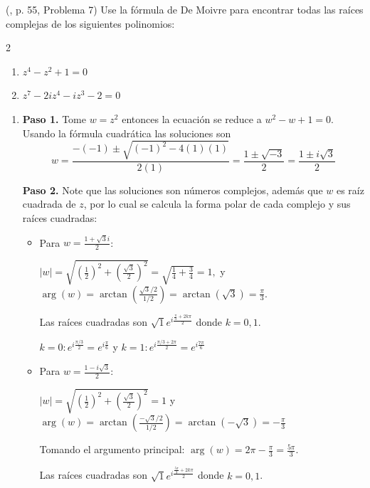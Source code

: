 \begin{example} (\cite{andreescu2014complex}, p. 55, Problema 7) Use la fórmula de De Moivre para encontrar todas las raíces complejas de los siguientes polinomios:

\begin{multicols}{2}
\begin{enumerate}[$a)$]
\item $z^4-z^2+1=0$
\item $z^7-2iz^4-iz^3-2=0$
\end{enumerate}
\end{multicols}

\begin{myproof}
\begin{enumerate}[$a)$]
\item \textbf{Paso 1.} Tome $w=z^2$ entonces la ecuación se reduce a $w^2-w+1=0$. Usando la fórmula cuadrática las soluciones son  $$w = \frac{-(-1)\pm\sqrt{(-1)^2-4(1)(1)}}{2(1)} = \frac{1\pm\sqrt{-3}}{2} = \frac{1\pm i\sqrt{3}}{2}$$

\textbf{Paso 2.} Note que las soluciones son números complejos, además que $w$ es raíz cuadrada de $z$, por lo cual se calcula la forma polar de cada complejo y sus raíces cuadradas:

\begin{itemize}
\item Para $w=\frac{1+\sqrt{3}i}{2}$:  

$|w| = \sqrt{\left( \frac{1}{2} \right)^2 + \left( \frac{\sqrt{3}}{2} \right)^2} = \sqrt{\frac{1}{4}+\frac{3}{4}} = 1,$ y $\arg(w) = \arctan\left( \frac{\sqrt{3}/2}{1/2} \right) = \arctan(\sqrt{3}) = \frac{\pi}{3}.$


Las raíces cuadradas son $\sqrt{1} e^{i\frac{\frac{\pi}{3}+2k\pi}{2}}$ donde $k=0,1$.

$k=0:   e^{i\frac{\pi/3}{2}} = \boxed{e^{i\frac{\pi}{6}}}$ y $k=1: e^{i\frac{\pi/3+2\pi}{2}} = \boxed{e^{i\frac{7\pi}{6}}}$

\item Para $w=\frac{1-i\sqrt{3}}{2}$:

$|w| = \sqrt{\left( \frac{1}{2} \right)^2 + \left( \frac{\sqrt{3}}{2} \right)^2} = 1$ y $\arg(w) = \arctan\left( \frac{-\sqrt{3}/2}{1/2} \right) = \arctan(-\sqrt{3}) = -\frac{\pi}{3}$


Tomando el argumento principal: $\arg(w) = 2\pi - \frac{\pi}{3} = \frac{5\pi}{3}$.

Las raíces cuadradas son $\sqrt{1} e^{i\frac{\frac{5\pi}{3}+2k\pi}{2}}$ donde $k=0,1$.


\end{itemize}
\end{enumerate}
\end{myproof}
\end{example}
